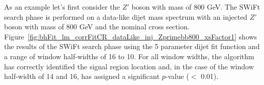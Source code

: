 

As an example let's first consider the $Z'$ boson with mass of 800 GeV.
The SWiFt search phase is performed on a data-like dijet mass spectrum
with an injected  $Z'$ boson with mass of 800 GeV and the nominal cross section.
Figure~\ref{fig:bhFit_lm_corrFitCR_dataLike_inj_Zprimebb800_xsFactor1}
shows the results of the SWiFt search phase
using the 5 parameter dijet fit function and a range of window half-widths of 16 to 10.
For all window widths, the \bh{} algorithm has correctly identified the signal region location
and, in the case of the window half-width of 14 and 16, has assigned a significant \mbox{\mbox{$p$-value}} ($<$ 0.01).

